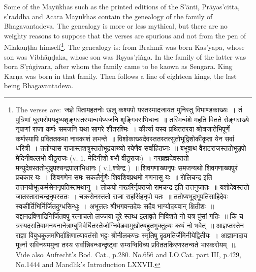 \documentclass[11pt, openany]{book}
\begin{document}
Some of the Mayūkhas such as the printed editions of the S'ānti, Prāyas'citta, s'rāddha and Ācāra Mayūkhas contain the genealogy of the family of Bhagavantadeva. The genealogy is more or less mythical, but there are no weighty reasons to suppose that the verses are spurious and not from the pen of Nīlakaṇṭha himself\renewcommand{\thefootnote}{1}\footnote{The verses are:\textendash\ जज्ञे पितामहतनोः खलु कश्यपो यस्तस्मादजायत मुनिस्तु विभाण्डकाख्यः~। तं पुत्रिणां धुरमरोपयदृष्यशृङ्गस्तस्यान्वयेप्यजनि शृङ्गिवराभिधानः~॥ तस्मिन्वंशे महति वितते सेङ्गराख्ये नृपाणां राजा कर्णः समजनि यथा सागरे शीतरश्मिः~। कीर्त्या यस्य प्रथिततरया श्रोत्रजातेभिपूर्णे कर्णस्यापि प्रविततकथा नावकाशं लभन्ते~॥ विशोकाख्यदेवस्ततस्तत्सुतोभूद्विशोकीकृता येन सर्वा धरित्री~। ततोप्यास राजास्तशत्रुस्ततोभूद्रयाख्यो रयेणैव सर्वाहितघ्नः~॥ बभूवाथ वैराटराजस्ततोभून्नृपो मेदिनीवल्लभो वीठुराजः (v. 1. मेदिनीशो बभौ वीठुराजः)~। नरब्रह्मदेवस्ततो मन्युदेवस्ततोभून्नृपश्चन्द्रपालाभिधानः ( v.l.श्चेन्द्र )~॥ शिवगणाख्यनृपः समजन्यथो शिवगणाख्यपुरं प्रचकार यः~। शिवगणेन समः सकलैर्गुणैः शिवशिवप्रथमो गणनासु यः~॥ रोलिचन्द्र इति तत्तनयोभूत्कर्मसेननृपतिस्तमथानु~। लोकपो नरहरिर्नृपराजो रामचन्द्र इति तत्तनुजातः~॥ यशोदेवस्ततो जातस्ताराचन्द्रनृपस्ततः~। चक्रसेनस्ततो राजा राहसिंहनृपो यतः~॥ ततोप्यभूद्भूपतिसाहिदेवः स्वकीर्तिभिर्निर्जितदुग्धसिन्धुः~। अभूत्ततः श्रीभगवन्तदेवः सदैव भाग्योदयवान् क्षितीशः~॥ यद्दानद्रविणाद्रिनिर्जितवपु रत्नाचलो लज्जया दूरे स्तब्ध इलावृते निविशते नो यत्र पुंसां गतिः~॥ किं च त्रस्यदरातिवामनयनानेत्राम्बुभिर्वर्धितस्तेजोग्निर्वडवामुखोत्थहुतभुक्तुल्यः कथं नो भवेत्~॥ आज्ञप्तस्तेन राज्ञा विबुधकुलमणिर्दाक्षिणात्यावतंसो भट्टः श्रीनीलकण्ठः स्मृतिषु दृढमतिर्जैमिनीयेद्वितीयः~। आज्ञामादाय मूर्ध्ना सविनयममुना तस्य सर्वान्निबन्धान्दृष्ट्वा सम्यग्विविच्य प्रविततकिरणस्तन्यते भास्करोयम्~॥. Vide also Aufrecht's Bod. Cat., p.280. No.656 and I.O.Cat. part III, p.429, No.1444 and Mandlik's Introduction LXXVII.}. The genealogy is: from Brahmā was born Kas'yapa, whose son was Vibhāṇḍaka, whose son was Rṣyas'ṛiṅga. In the family of the latter was born S'ṛṅgivara, after whom the family came to be kaown as Sengara. King Karṇa was born in that family. Then follows a line of eighteen kings, the last being Bhagavantadeva.

\newpage
\end{document}
